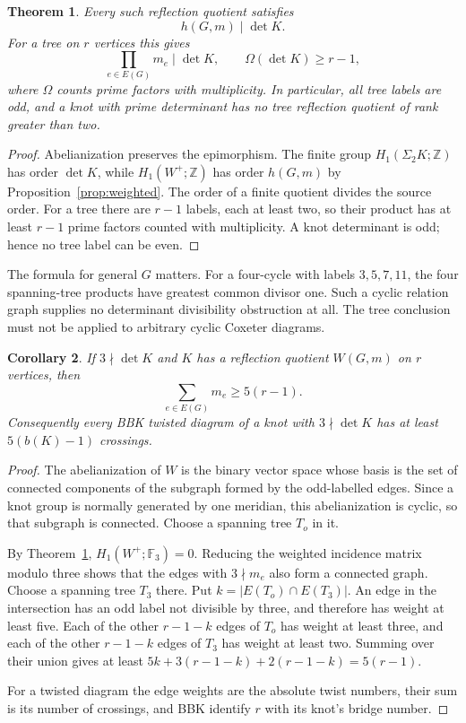 \documentclass[11pt]{article}
\newtheorem{theorem}{Theorem}
\newtheorem{corollary}[theorem]{Corollary}
\newcommand{\Z}{\mathbb Z}
\newcommand{\F}{\mathbb F}
\begin{document}
\begin{theorem}\label{thm:det}
Every such reflection quotient satisfies
\[
                         h(G,m)\mid\det K.
\]
For a tree on $r$ vertices this gives
\[
 \prod_{e\in E(G)}m_e\mid\det K,
 \qquad \Omega(\det K)\ge r-1,
\]
where $\Omega$ counts prime factors with multiplicity.  In particular,
all tree labels are odd, and a knot with prime determinant has no
tree reflection quotient of rank greater than two.
\end{theorem}
\begin{proof}
Abelianization preserves the epimorphism.  The finite group
$H_1(\Sigma_2K;\Z)$ has order $\det K$, while
$H_1(W^+;\Z)$ has order $h(G,m)$ by
Proposition~\ref{prop:weighted}.  The order of a finite quotient
divides the source order.  For a tree there are $r-1$ labels, each
at least two, so their product has at least $r-1$ prime factors
counted with multiplicity.  A knot determinant is odd; hence no
tree label can be even.
\end{proof}

The formula for general $G$ matters.  For a four-cycle with labels
$3,5,7,11$, the four spanning-tree products have greatest common
divisor one.  Such a cyclic relation graph supplies no determinant
divisibility obstruction at all.  The tree conclusion must not be
applied to arbitrary cyclic Coxeter diagrams.

\begin{corollary}\label{cor:weight}
If $3\nmid\det K$ and $K$ has a reflection quotient $W(G,m)$
on $r$ vertices, then
\[
                           \sum_{e\in E(G)}m_e\ge5(r-1).
\]
Consequently every BBK twisted diagram of a knot with
$3\nmid\det K$ has at least $5(b(K)-1)$ crossings.
\end{corollary}
\begin{proof}
The abelianization of $W$ is the binary vector space whose basis
is the set of connected components of the subgraph formed by the
odd-labelled edges.  Since a knot group is normally generated by
one meridian, this abelianization is cyclic, so that subgraph is
connected.  Choose a spanning tree $T_o$ in it.

By Theorem~\ref{thm:det}, $H_1(W^+;\F_3)=0$.  Reducing the
weighted incidence matrix modulo three shows that the edges with
$3\nmid m_e$ also form a connected graph.  Choose a spanning tree
$T_3$ there.  Put $k=|E(T_o)\cap E(T_3)|$.
An edge in the intersection has an odd label not divisible by
three, and therefore has weight at least five.  Each of the other
$r-1-k$ edges of $T_o$ has weight at least three, and each of the
other $r-1-k$ edges of $T_3$ has weight at least two.  Summing over
their union gives at least
$5k+3(r-1-k)+2(r-1-k)=5(r-1)$.

For a twisted diagram the edge weights are the absolute twist
numbers, their sum is its number of crossings, and BBK identify
$r$ with its knot's bridge number.
\end{proof}
\end{document}
